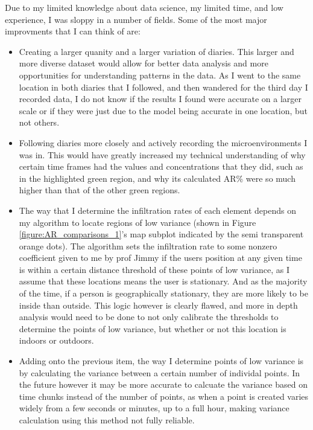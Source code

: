 \documentclass{article}
\begin{document}
\begin{multicols}{2}
Due to my limited knowledge about data science, my limited time, and low experience, I was 
sloppy in a number of fields. Some of the most major improvments that I can think of are:
\begin{itemize}
  \item Creating a larger quanity and a larger variation of diaries. This larger and more 
  diverse dataset would allow for better data analysis and more opportunities 
  for understanding patterns in the data. As I went to the same location in both diaries 
  that I followed, and then wandered for the third day I recorded data, I do not know
  if the results I found were accurate on a larger scale or if they were just due to 
  the model being accurate in one location, but not others. 
  \item Following diaries more closely and actively recording the microenvironments I 
  was in. This would have greatly increased my technical understanding of why 
  certain time frames had the values and concentrations that they did, such as in the 
  highlighted green region, and why its calculated AR\% were so much higher than that of
  the other green regions.
  \item The way that I determine the infiltration rates of each element depends on my
  algorithm to locate regions of low variance 
  (shown in Figure \ref{figure:AR_comparisons_1}'s map subplot indicated by the semi
  transparent orange dots). The algorithm sets the infiltration rate to some nonzero 
  coefficient given to me by prof Jimmy if the users position at any given time is 
  within a certain distance threshold of these points of low variance, as I assume that
  these locations means the user is stationary. And as the majority of the time, if 
  a person is geographically stationary, they are more likely to be inside than outside.
  This logic however is clearly flawed, and more in depth analysis would need to be done 
  to not only calibrate the thresholds to determine the points of low variance, but whether 
  or not this location is indoors or outdoors.
  \item Adding onto the previous item, the way I determine points of low variance 
  is by calculating the variance between a certain number of individal points. In the future
  however it may be more accurate to calcuate the variance based on time chunks instead 
  of the number of points, as when a point is created varies widely from a few seconds or minutes, 
  up to a full hour, making variance calculation using this method not fully reliable.
\end{itemize}


\end{multicols}
\end{document}
